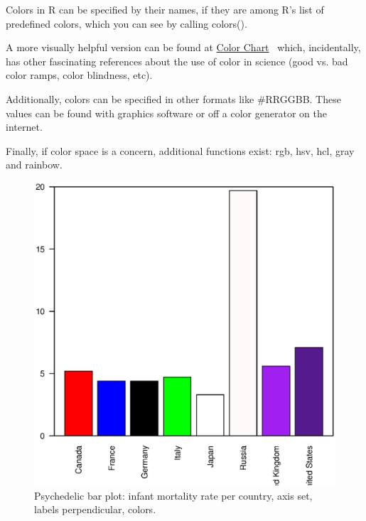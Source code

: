 \documentclass{report}
\newcommand{\code}[1]{\textsf{\ttfamily #1}}
\begin{document}
	\begin{tcolorbox}[title=Colors in R, parbox=false]
Colors in R can be specified by their names, if they are among R's list of predefined colors, which you can see by calling \code{colors()}.

A more visually helpful version can be found at \href{http://research.stowers.org/mcm/efg/R/Color/Chart/}{Color Chart}~\cite{rcolors} which, incidentally, has other fascinating references about the use of color in science (good vs. bad color ramps, color blindness, etc).

Additionally, colors can be specified in other formats like \code{\#RRGGBB}. These values can be found with graphics software or off a color generator on the internet.

Finally, if color space is a concern, additional functions exist: \code{rgb}, \code{hsv}, \code{hcl}, \code{gray} and \code{rainbow}.
	\end{tcolorbox}

	\begin{figure}[h]
		\centering
		\includegraphics[width=1.0\textwidth]{barpsych.eps}
		\caption{Psychedelic bar plot: infant mortality rate per country, axis set, labels perpendicular, colors.}
		\label{fig:barpsych}
	\end{figure}
\end{document}
